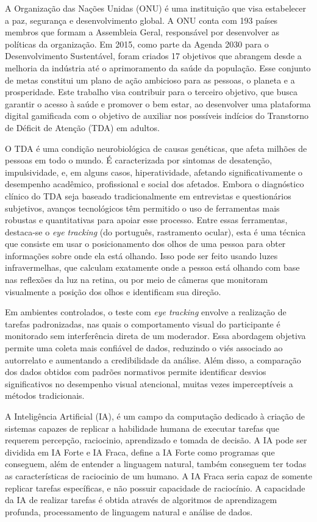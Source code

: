 A Organização das Nações Unidas (ONU) é uma instituição que visa estabelecer a paz,
segurança e desenvolvimento global. A ONU conta com 193 países membros que formam a
Assembleia Geral, responsável por desenvolver as políticas da organização. Em 2015, como
parte da Agenda 2030 para o Desenvolvimento Sustentável, foram criados 17 objetivos que
abrangem desde a melhoria da indústria até o aprimoramento da saúde da população. Esse
conjunto de metas constitui um plano de ação ambicioso para as pessoas, o planeta e a
prosperidade. Este trabalho visa contribuir para o terceiro objetivo, que busca garantir o
acesso à saúde e promover o bem estar, ao desenvolver uma plataforma digital gamificada
com o objetivo de auxiliar nos possíveis indícios do Transtorno de Déficit de Atenção (TDA)
em adultos.

O TDA é uma condição neurobiológica de causas genéticas, que afeta milhões de pessoas em todo o mundo. É caracterizada por sintomas de
desatenção, impulsividade, e, em alguns casos, hiperatividade, afetando significativamente o
desempenho acadêmico, profissional e social dos afetados. Embora o diagnóstico clínico do
TDA seja baseado tradicionalmente em entrevistas e questionários subjetivos, avanços
tecnológicos têm permitido o uso de ferramentas mais robustas e quantitativas para apoiar
esse processo. \textcite{BVS2014}
Entre essas ferramentas, destaca-se o \textit{eye tracking} (do português, rastramento ocular), esta é uma técnica
que consiste em usar o posicionamento dos olhos de uma pessoa para obter informações
sobre onde ela está olhando. Isso pode ser feito usando luzes infravermelhas, que calculam
exatamente onde a pessoa está olhando com base nas reflexões da luz na retina, ou por
meio de câmeras que monitoram visualmente a posição dos olhos e identificam sua direção.

Em ambientes controlados, o teste com \textit{eye tracking} envolve a realização de tarefas
padronizadas, nas quais o comportamento visual do participante é monitorado sem
interferência direta de um moderador. Essa abordagem objetiva permite uma coleta mais
confiável de dados, reduzindo o viés associado ao autorrelato e aumentando a credibilidade
da análise. Além disso, a comparação dos dados obtidos com padrões normativos permite
identificar desvios significativos no desempenho visual atencional, muitas vezes
imperceptíveis a métodos tradicionais.

A Inteligência Artificial (IA), é um campo da computação dedicado à criação de sistemas capazes de replicar a habilidade humana de executar tarefas que requerem percepção, raciocinio, aprendizado e tomada de decisão. A IA pode ser dividida em IA Forte e IA Fraca, \textcite{sep-chinese-room} define a IA Forte como programas que conseguem, além de entender a linguagem natural, também conseguem ter todas as características de raciocinio de um humano. A IA Fraca seria capaz de somente replicar tarefas específicas, e não possuir capacidade de raciocínio. A capacidade da IA de realizar tarefas é obtida através de algoritmos de aprendizagem profunda, processamento de linguagem natural e análise de dados.

